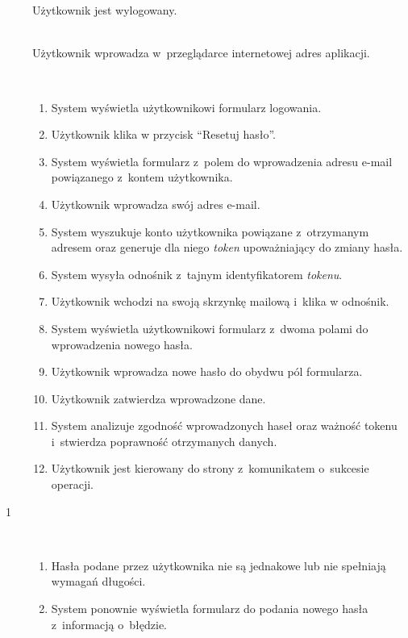 \documentclass[11pt]{aghdpl}
\begin{document}
	\begin{description}
		\item[\useCaseAktor] \hfill \\
			\useCaseUzytkownik
		\item[\useCaseWarPocz] \hfill \\
			Użytkownik jest wylogowany.
		\item[\useCaseZdarzInicj] \hfill \\
			Użytkownik wprowadza w~przeglądarce internetowej adres aplikacji.
		\item[\useCaseScenBaz] \hfill \\ 
			\begin{enumerate}
			\item System wyświetla użytkownikowi formularz logowania.
			\item Użytkownik klika w przycisk ``Resetuj hasło''.
			\item System wyświetla formularz z~polem do wprowadzenia adresu e-mail powiązanego z~kontem użytkownika.
			\item Użytkownik wprowadza swój adres e-mail.
			\item System wyszukuje konto użytkownika powiązane z~otrzymanym adresem oraz generuje dla niego \emph{token} upoważniający do zmiany hasła.
			\item System wysyła odnośnik z~tajnym identyfikatorem \emph{tokenu}.
			\item Użytkownik wchodzi na swoją skrzynkę mailową i~klika w odnośnik.
			\item System wyświetla użytkownikowi formularz z~dwoma polami do wprowadzenia nowego hasła.
			\item Użytkownik wprowadza nowe hasło do obydwu pól formularza.
			\item Użytkownik zatwierdza wprowadzone dane.
			\item System analizuje zgodność wprowadzonych haseł oraz ważność tokenu i~stwierdza poprawność otrzymanych danych.
			\item Użytkownik jest kierowany do strony z~komunikatem o~sukcesie operacji.
			\end{enumerate}
		\item[\useCaseScenAlt~1] \hfill \\
			\begin{enumerate}[label=11a\arabic*.]
			\item Hasła podane przez użytkownika nie są jednakowe lub nie spełniają wymagań długości.
			\item System ponownie wyświetla formularz do podania nowego hasła z~informacją o~błędzie.

\end{enumerate}
\end{description}
\end{document}
